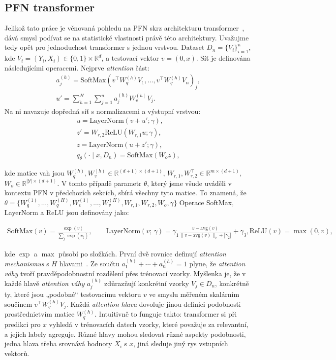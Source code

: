 \subsection{PFN transformer}
\label{subsec:pfn-transformer}
Jelikož tato práce je věnovaná pohledu na PFN skrz architekturu transformer~\cite{vaswani2017}, dává smysl podívat se na statistické vlastnosti právě této architektury.
Uvažujme tedy opět  pro jednoduchost transformer s jednou vrstvou. 
Dataset $D_n = \{V_i\}_{i=1}^n$, kde $V_i = (Y_i, X_i) \in \{0,1\} \times \mathbb{R}^d$, a testovací vektor $v = (0, x)$. 
Síť je definována následujícími operacemi.
Nejprve \emph{attention} část:
\begin{gather*}
a_j^{(h)} = \mathrm{SoftMax}\left(v^\top W_q^{(h)}V_1, \dots, v^\top W_q^{(h)}V_n\right)_j, \\[1ex]
u' = \sum_{h=1}^H \sum_{j=1}^n a_j^{(h)} W_v^{(h)} V_j.
\end{gather*}
Na ni navazuje dopředná síť s normalizacemi a výstupní vrstvou:
\begin{gather*}
u = \mathrm{LayerNorm}(v + u'; \gamma), \\[1ex]
z' = W_{r,2}\mathrm{ReLU}(W_{r,1}u; \gamma), \\[1ex]
z = \mathrm{LayerNorm}(u + z'; \gamma), \\[1ex]
q_\theta(\cdot \mid x, D_n) = \mathrm{SoftMax}(W_o z),
\end{gather*}

kde matice vah jsou $W^{(h)}_q, W^{(h)}_v \in \mathbb{R}^{(d+1)\times(d+1)}$, $W_{r,1}, W_{r,2}^\top \in \mathbb{R}^{m\times(d+1)}$, $W_o \in \mathbb{R}^{|\mathcal{Y}|\times(d+1)}$. 
V tomto případě parametr $\theta$, který jsme všude uváděli v kontextu PFN v předchozích sekcích, sbírá všechny tyto matice. 
To znamená, že $\theta = \{ W_q^{(1)}, \dots, W_q^{(H)}, W_v^{(1)}, \dots, W_v^{(H)}, W_{r,1}, W_{r,2}, W_o, \gamma \}$
Operace SoftMax, LayerNorm a ReLU jsou definovány jako:

\begin{gather*}
\mathrm{SoftMax}(v) = \frac{\exp(v)}{\sum_j \exp(v_j)}, \qquad \mathrm{LayerNorm}(v;\,\gamma) = \gamma_1 \frac{v - \mathrm{avg}(v)}{\|v - \mathrm{avg}(v)\|_2 + |\gamma_2|} + \gamma_3,
\mathrm{ReLU}(v) = \max(0, v),
\end{gather*}

kde $\exp$ a $\max$ působí po složkách.
První dvě rovnice definují \emph{attention mechanismus} s $H$ hlavami~\cite{vaswani2017}.
Ze součtu $a^{(h)}_1 + \cdots + a^{(h)}_n = 1$ plyne, že \emph{attention váhy} tvoří pravděpodobnostní rozdělení přes trénovací vzorky.
Myšlenka je, že v každé hlavě \emph{attention váhy} $a^{(h)}_j$ zdůrazňují konkrétní vzorky $V_j \in D_n$, konkrétně ty, které jsou „podobné“ testovacímu vektoru $v$ ve smyslu měřeném skalárním součinem $v^\top W^{(h)}_q V_j$. 
Každá \emph{attention hlava} dovoluje jinou definici podobnosti prostřednictvím matice $W^{(h)}_q$.
Intuitivně to funguje takto: transformer si při predikci pro $x$ vyhledá v trénovacích datech vzorky, které považuje za relevantní, a jejich labely agreguje. Různé hlavy mohou sledovat různé aspekty podobnosti, jedna hlava třeba srovnává hodnoty $X_i$ s $x$, jiná sleduje jiný rys vstupních vektorů.
\par   

